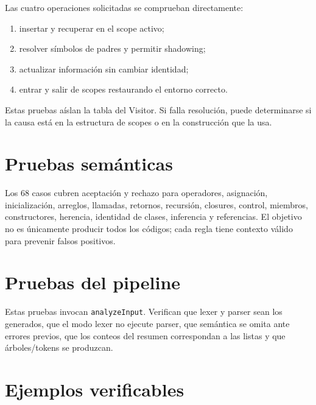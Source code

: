 \documentclass[11pt,letterpaper,oneside]{report}
\newcommand{\codigo}[1]{\texttt{#1}}
\begin{document}
Las cuatro operaciones solicitadas se comprueban directamente:

\begin{enumerate}
  \item insertar y recuperar en el scope activo;
  \item resolver símbolos de padres y permitir shadowing;
  \item actualizar información sin cambiar identidad;
  \item entrar y salir de scopes restaurando el entorno correcto.
\end{enumerate}

Estas pruebas aíslan la tabla del Visitor. Si falla resolución, puede determinarse si
la causa está en la estructura de scopes o en la construcción que la usa.

\section{Pruebas semánticas}

Los 68 casos cubren aceptación y rechazo para operadores, asignación, inicialización,
arreglos, llamadas, retornos, recursión, closures, control, miembros, constructores,
herencia, identidad de clases, inferencia y referencias. El objetivo no es únicamente
producir todos los códigos; cada regla tiene contexto válido para prevenir falsos
positivos.

\section{Pruebas del pipeline}

Estas pruebas invocan \codigo{analyzeInput}. Verifican que lexer y parser sean los
generados, que el modo lexer no ejecute parser, que semántica se omita ante errores
previos, que los conteos del resumen correspondan a las listas y que árboles/tokens
se produzcan.

\section{Ejemplos verificables}
\end{document}
